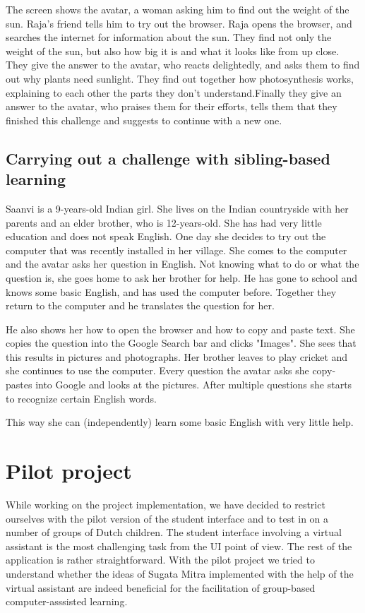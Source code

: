 \documentclass[a4paper]{article}
\begin{document}
The screen shows the avatar, a woman asking him to find out the weight of the sun. Raja's friend tells him to try out the browser. Raja opens the browser, and searches the internet for information about the sun. They find not only the weight of the sun, but also how big it is and what it looks like from up close. They give the answer to the avatar, who reacts delightedly, and asks them to find out why plants need sunlight. They find out together how photosynthesis works, explaining to each other the parts they don't understand.Finally they give an answer to the avatar, who praises them for their efforts, tells them that they finished this challenge and suggests to continue with a new one. 

\subsection{Carrying out a challenge with sibling-based learning} 

Saanvi is a 9-years-old Indian girl. She lives on the Indian countryside with her parents and an elder brother, who is 12-years-old. She has had very little education and does not speak English. One day she decides to try out the computer that was recently installed in her village. She comes to the computer and the avatar asks her question in English. Not knowing what to do or what the question is, she goes home to ask her brother for help. He has gone to school and knows some basic English, and has used the computer before. Together they return to the computer and he translates the question for her. 

He also shows her how to open the browser and how to copy and paste text. She copies the question into the Google Search bar and clicks "Images". She sees that this results in pictures and photographs. Her brother leaves to play cricket and she continues to use the computer. Every question the avatar asks she copy-pastes into Google and looks at the pictures. After multiple questions she starts to recognize certain English words.

This way she can (independently) learn some basic English with very little help. 

\section{Pilot project}

While working on the project implementation, we have decided to restrict ourselves with the pilot version of the student interface and to test in on a number of groups of Dutch children. The student interface involving a virtual assistant is the most challenging task from the UI point of view. The rest of the application is rather straightforward. With the pilot project we tried to understand whether the ideas of Sugata Mitra implemented with the help of the virtual assistant are indeed beneficial for the facilitation of group-based computer-asssisted learning.
\end{document}
